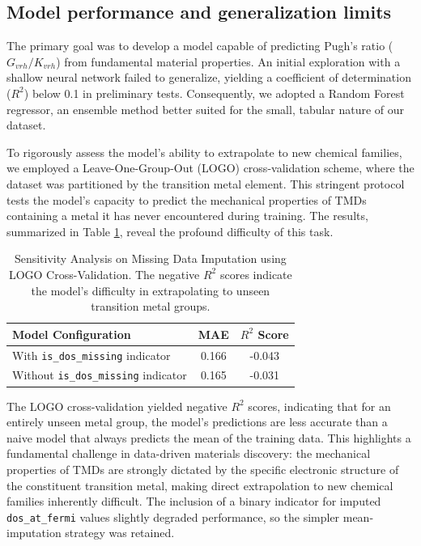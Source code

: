 \documentclass[]{article}
\begin{document}
\subsection{Model performance and generalization limits}

The primary goal was to develop a model capable of predicting Pugh's ratio ($G_{vrh}/K_{vrh}$) from fundamental material properties. An initial exploration with a shallow neural network failed to generalize, yielding a coefficient of determination ($R^2$) below 0.1 in preliminary tests. Consequently, we adopted a Random Forest regressor, an ensemble method better suited for the small, tabular nature of our dataset.

To rigorously assess the model's ability to extrapolate to new chemical families, we employed a Leave-One-Group-Out (LOGO) cross-validation scheme, where the dataset was partitioned by the transition metal element. This stringent protocol tests the model's capacity to predict the mechanical properties of TMDs containing a metal it has never encountered during training. The results, summarized in Table \ref{tab:logo_cv}, reveal the profound difficulty of this task.

\begin{table}[h!]
\centering
\caption{Sensitivity Analysis on Missing Data Imputation using LOGO Cross-Validation. The negative $R^2$ scores indicate the model's difficulty in extrapolating to unseen transition metal groups.}
\label{tab:logo_cv}
\begin{tabular}{lcc}
\hline
\hline
Model Configuration & MAE & $R^2$ Score \\
\hline
With \texttt{is\_dos\_missing} indicator & 0.166 & -0.043 \\
Without \texttt{is\_dos\_missing} indicator & 0.165 & -0.031 \\
\hline
\end{tabular}
\end{table}

The LOGO cross-validation yielded negative $R^2$ scores, indicating that for an entirely unseen metal group, the model's predictions are less accurate than a naive model that always predicts the mean of the training data. This highlights a fundamental challenge in data-driven materials discovery: the mechanical properties of TMDs are strongly dictated by the specific electronic structure of the constituent transition metal, making direct extrapolation to new chemical families inherently difficult. The inclusion of a binary indicator for imputed \texttt{dos\_at\_fermi} values slightly degraded performance, so the simpler mean-imputation strategy was retained.
\end{document}
